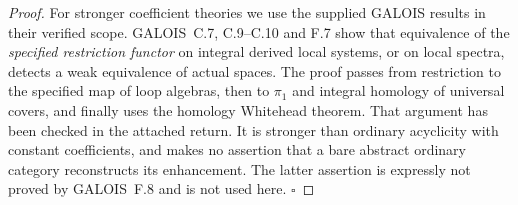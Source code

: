 \begin{proof}
For stronger coefficient theories we use the supplied GALOIS results in their verified scope. GALOIS~C.7, C.9--C.10 and F.7 show that equivalence of the \emph{specified restriction functor} on integral derived local systems, or on local spectra, detects a weak equivalence of actual spaces. The proof passes from restriction to the specified map of loop algebras, then to $\pi_1$ and integral homology of universal covers, and finally uses the homology Whitehead theorem. That argument has been checked in the attached return. It is stronger than ordinary acyclicity with constant coefficients, and makes no assertion that a bare abstract ordinary category reconstructs its enhancement. The latter assertion is expressly not proved by GALOIS~F.8 and is not used here. \hfill$\square$
\end{proof}

